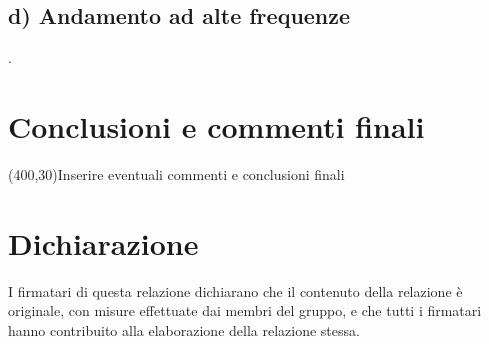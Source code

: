 \documentclass[10pt,a4paper]{article}
\begin{document}
\subsection*{d) Andamento ad alte frequenze}
.
\section*{Conclusioni e commenti finali}
\framebox(400,30){Inserire eventuali commenti e conclusioni finali}

\section*{Dichiarazione}
I firmatari di questa relazione dichiarano che il contenuto della relazione \`e originale, con misure effettuate dai membri del gruppo, e che tutti i firmatari hanno contribuito alla elaborazione della relazione stessa.
\end{document}
